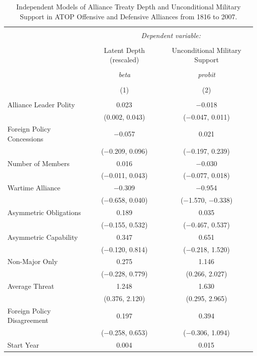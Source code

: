 \documentclass[12pt]{article}
\begin{document}
\begin{table}[!htbp] \centering 
  \caption{Independent Models of Alliance Treaty Depth and Unconditional Military Support in ATOP Offensive and Defensive Alliances from 1816 to 2007.} 
  \label{tab:separate-models} 
\begin{tabular}{@{\extracolsep{5pt}}lcc} 
\\[-1.8ex]\hline 
\hline \\[-1.8ex] 
 & \multicolumn{2}{c}{\textit{Dependent variable:}} \\ 
\cline{2-3} 
\\[-1.8ex] & Latent Depth (rescaled) & Unconditional Military Support \\ 
\\[-1.8ex] & \textit{beta} & \textit{probit} \\ 
\\[-1.8ex] & (1) & (2)\\ 
\hline \\[-1.8ex] 
  Alliance Leader Polity & 0.023$^{}$ & $-$0.018 \\ 
  & (0.002, 0.043) & ($-$0.047, 0.011) \\ 
  Foreign Policy Concessions & $-$0.057 & 0.021 \\ 
  & ($-$0.209, 0.096) & ($-$0.197, 0.239) \\ 
  Number of Members & 0.016 & $-$0.030 \\ 
  & ($-$0.011, 0.043) & ($-$0.077, 0.018) \\ 
  Wartime Alliance & $-$0.309$^{}$ & $-$0.954$^{}$ \\ 
  & ($-$0.658, 0.040) & ($-$1.570, $-$0.338) \\ 
  Asymmetric Obligations & 0.189 & 0.035 \\ 
  & ($-$0.155, 0.532) & ($-$0.467, 0.537) \\ 
  Asymmetric Capability & 0.347 & 0.651 \\ 
  & ($-$0.120, 0.814) & ($-$0.218, 1.520) \\ 
  Non-Major Only & 0.275 & 1.146$^{}$ \\ 
  & ($-$0.228, 0.779) & (0.266, 2.027) \\ 
  Average Threat & 1.248$^{}$ & 1.630$^{}$ \\ 
  & (0.376, 2.120) & (0.295, 2.965) \\ 
  Foreign Policy Disagreement & 0.197 & 0.394 \\ 
  & ($-$0.258, 0.653) & ($-$0.306, 1.094) \\ 
  Start Year & 0.004$^{}$ & 0.015$^{}$ \\ 

\end{tabular}
\end{table}
\end{document}
